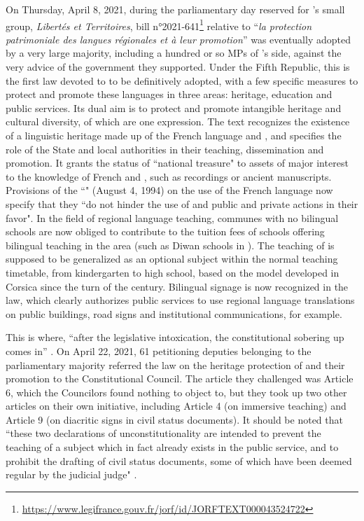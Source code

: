 \documentclass[output=paper,colorlinks,citecolor=brown]{langscibook}
\begin{document}
On Thursday, April 8, 2021, during the parliamentary day reserved for 's small group, \textit{Libertés et Territoires}, bill n°2021-641\footnote{\url{https://www.legifrance.gouv.fr/jorf/id/JORFTEXT000043524722}} relative to ``\textit{la protection patrimoniale des langues régionales et à leur promotion}” was eventually adopted by a very large majority, including a hundred or so MPs of ’s side, against the very advice of the government they supported. Under the Fifth Republic, this is the first law devoted to  to be definitively adopted, with a few specific measures to protect and promote these languages in three areas: heritage, education and public services. Its dual aim is to protect and promote intangible heritage and cultural diversity, of which  are one expression. The text recognizes the existence of a linguistic heritage made up of the French language and , and specifies the role of the State and local authorities in their teaching, dissemination and promotion. It grants the status of ``national treasure" to assets of major interest to the knowledge of French and , such as recordings or ancient manuscripts. Provisions of the ``" (August 4, 1994) on the use of the French language now specify that they ``do not hinder the use of  and public and private actions in their favor". In the field of regional language teaching, communes with no bilingual schools are now obliged to contribute to the tuition fees of schools offering bilingual teaching in the area (such as Diwan schools in ). The teaching of  is supposed to be generalized as an optional subject within the normal teaching timetable, from kindergarten to high school, based on the model developed in Corsica since the turn of the century. Bilingual signage is now recognized in the law, which clearly authorizes public services to use regional language translations on public buildings, road signs and institutional communications, for example. 

This is where, ``after the legislative intoxication, the constitutional sobering up comes in” \citep{sm:Arlettaz2021}. On April 22, 2021, 61 petitioning deputies belonging to the parliamentary majority referred the law on the heritage protection of  and their promotion to the Constitutional Council. The article they challenged was Article 6, which the Councilors found nothing to object to, but they took up two other articles on their own initiative, including Article 4 (on immersive teaching) and Article 9 (on diacritic signs in civil status documents). It should be noted that ``these two declarations of unconstitutionality are intended to prevent the teaching of a subject which in fact already exists in the public service, and to prohibit the drafting of civil status documents, some of which have been deemed regular by the judicial judge" \citep{sm:Arlettaz2021}.
\end{document}
